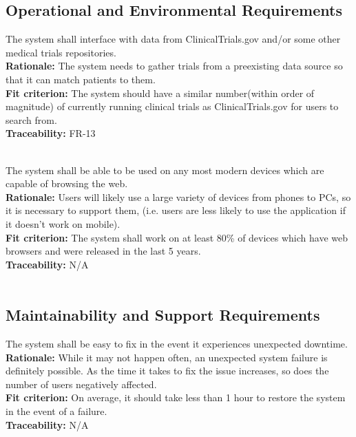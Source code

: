 \documentclass[12pt, titlepage]{article}
\newcounter{NFR_Counter}
\newcounter{FR_Counter}
\begin{document}
\subsection{Operational and Environmental Requirements}

The system shall interface with data from ClinicalTrials.gov and/or some other medical trials repositories.\\
\textbf{Rationale:}
The system needs to gather trials from a preexisting data source so that it can match patients to them.\\
\textbf{Fit criterion:}
The system should have a similar number(within order of magnitude) of currently running clinical trials as ClinicalTrials.gov for users to search from.\\
\textbf{Traceability:}
FR-13 \\~\\
\addtocounter{NFR_Counter}{1}

The system shall be able to be used on any most modern devices which are capable of browsing the web.\\
\textbf{Rationale:}
Users will likely use a large variety of devices from phones to PCs, so it is necessary to support them, (i.e. users are less likely to use the application if it doesn't work on mobile).\\
\textbf{Fit criterion:}
The system shall work on at least 80\% of devices which have web browsers and were released in the last 5 years.\\
\textbf{Traceability:}
N/A \\~\\
\addtocounter{NFR_Counter}{1}

\subsection{Maintainability and Support Requirements}


The system shall be easy to fix in the event it experiences unexpected downtime.\\
\textbf{Rationale:}
While it may not happen often, an unexpected system failure is definitely possible. As the time it takes 
to fix the issue increases, so does the number of users negatively affected.\\
\textbf{Fit criterion:}
On average, it should take less than 1 hour to restore the system in the event of a failure.\\
\textbf{Traceability:}
N/A \\~\\
\addtocounter{NFR_Counter}{1}
\end{document}
